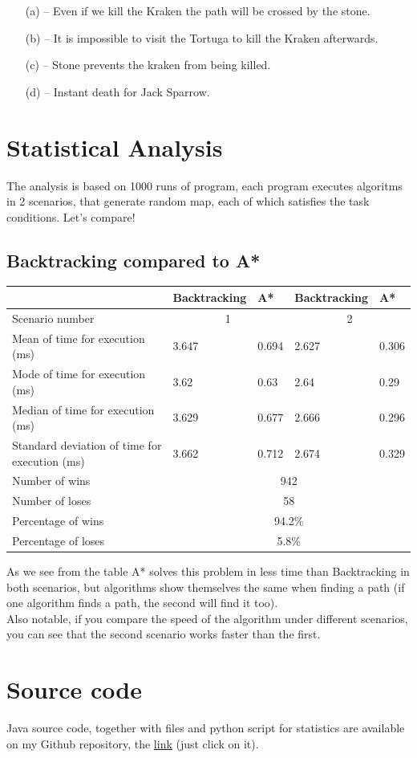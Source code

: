 \documentclass[a4paper]{article}
\begin{document}
\begin{enumerate}
    \item [(a)] -- Even if we kill the Kraken the path will be crossed by the stone.
    \item [(b)] -- It is impossible to visit the Tortuga to kill the Kraken afterwards.
    \item [(c)] -- Stone prevents the kraken from being killed.
    \item [(d)] -- Instant death for Jack Sparrow.
\end{enumerate}
\section{Statistical Analysis}
The analysis is based on 1000 runs of program, each program executes algoritms in 2 scenarios, that generate random map, each of which satisfies the task conditions. Let's compare!
\subsection*{Backtracking compared to A*} 

\begin{center}
\begin{tabular}{ |p{5cm}|p{2cm}|p{2cm}|p{2cm}|p{2cm}| }
    \hline
    & Backtracking&A*&Backtracking&A*\\
    \hline
    Scenario number&\multicolumn{2}{|c|}{1} & \multicolumn{2}{|c|}{2}\\
    \hline
    Mean of time for execution (ms)& 3.647 & 0.694 &2.627& 0.306\\
    Mode of time for execution (ms) & 3.62  & 0.63&2.64& 0.29\\
    Median of time for execution (ms)& 3.629 & 0.677&2.666& 0.296\\
    Standard deviation of time for execution (ms) & 3.662 & 0.712&2.674& 0.329\\
    \hline
    Number of wins & \multicolumn{4}{|c|}{942} \\
    Number of loses & \multicolumn{4}{|c|}{58}  \\
    Percentage of wins & \multicolumn{4}{|c|}{94.2\%} \\
    Percentage of loses & \multicolumn{4}{|c|}{5.8\%} \\
    \hline
\end{tabular}
\end{center}
As we see from the table A* solves this problem in less time than Backtracking in both scenarios, but algorithms show themselves the same when finding a path (if one algorithm finds a path, the second will find it too).\\
Also notable, if you compare the speed of the algorithm under different scenarios, you can see that the second scenario works faster than the first.

\section{Source code}
Java source code, together with files and python script for statistics are available on my Github repository, the \href{https://github.com/NAD777/AI-assignment-1}{link} (just click on it).
\end{document}
